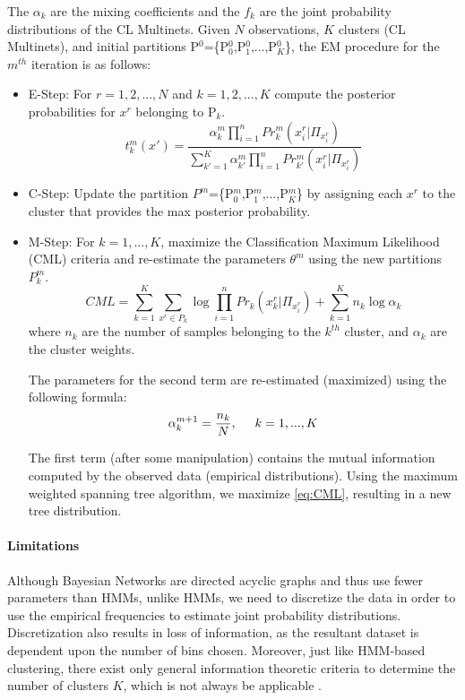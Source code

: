 The $\alpha_k$ are the mixing coefficients and the $f_k$ are the joint probability distributions of the CL Multinets.
 Given $N$ observations, $K$ clusters (CL Multinets), and initial partitions P$^0$=\{P$_0^0$,P$_1^0$,...,P$_K^0$\}, the EM procedure for the $m^{th}$ iteration is as follows:
 \begin{itemize}
     \item E-Step: For $r=1,2,...,N$ and $k=1,2,...,K$ compute the posterior probabilities for $x^r$ belonging to P$_k$.
     \begin{equation}
         t_k^m(x') = \frac{\alpha_k^m \prod_{i=1}^{n} Pr_k^m(x_i^r|\Pi_{x_i^r})}{\sum_{k'=1}^{K}\alpha_{k'}^m \prod_{i=1}^{n} Pr_{k'}^m(x_i^r | \Pi_{x_i^r})}
     \end{equation}
     \item C-Step: Update the partition $P^m$=\{P$_0^m$,P$_1^m$,...,P$_K^m$\} by assigning each $x^r$ to the cluster that provides the max posterior probability.
     \item M-Step: For $k=1,...,K$, maximize the Classification Maximum Likelihood (CML) criteria and re-estimate the parameters $\theta^m$ using the new partitions $P_k^m$.
     \begin{equation} \label{eq:CML}
         CML = \sum_{k=1}^{K}\sum_{x^r \in P_k} \log \prod_{i=1}^{n} Pr_k(x_k^r | \Pi_{x_i^r}) + \sum_{k=1}^{K} n_k \log \alpha_k
     \end{equation}
      where $n_k$ are the number of samples belonging to the $k^{th}$ cluster, and $\alpha_k$ are the cluster weights.
      
      The parameters for the second term are re-estimated (maximized) using the following formula:
      \begin{equation}
          \alpha_k^{m+1} = \frac{n_k}{N}, \hspace{0.5cm} k=1,...,K
      \end{equation}
      
      The first term (after some manipulation) contains the mutual information computed by the observed data (empirical distributions). Using the maximum weighted spanning tree algorithm, we maximize \eqref{eq:CML}, resulting in a new tree distribution.
\end{itemize}

\paragraph{Limitations}
Although Bayesian Networks are directed acyclic graphs and thus use fewer parameters than HMMs, unlike HMMs, we need to discretize the data in order to use the empirical frequencies to estimate joint probability distributions. Discretization also results in loss of information, as the resultant dataset is dependent upon the number of bins chosen. Moreover, just like HMM-based clustering, there exist only general information theoretic criteria to determine the number of clusters $K$, which is not always be applicable \cite{pham2009unsupervised}.

